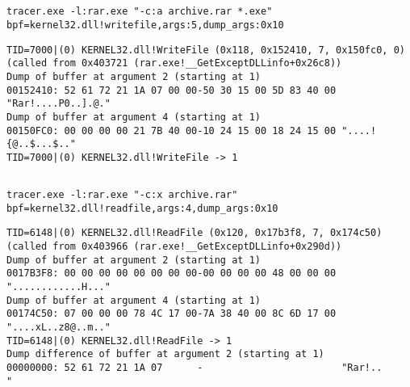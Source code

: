 \subsection{}

\begin{lstlisting}
tracer.exe -l:rar.exe "-c:a archive.rar *.exe" bpf=kernel32.dll!writefile,args:5,dump_args:0x10
\end{lstlisting}


\begin{lstlisting}
TID=7000|(0) KERNEL32.dll!WriteFile (0x118, 0x152410, 7, 0x150fc0, 0) (called from 0x403721 (rar.exe!__GetExceptDLLinfo+0x26c8))
Dump of buffer at argument 2 (starting at 1)
00152410: 52 61 72 21 1A 07 00 00-50 30 15 00 5D 83 40 00 "Rar!....P0..].@."
Dump of buffer at argument 4 (starting at 1)
00150FC0: 00 00 00 00 21 7B 40 00-10 24 15 00 18 24 15 00 "....!{@..$...$.."
TID=7000|(0) KERNEL32.dll!WriteFile -> 1
\end{lstlisting}

\subsection{}

\begin{lstlisting}
tracer.exe -l:rar.exe "-c:x archive.rar" bpf=kernel32.dll!readfile,args:4,dump_args:0x10
\end{lstlisting}


\begin{lstlisting}
TID=6148|(0) KERNEL32.dll!ReadFile (0x120, 0x17b3f8, 7, 0x174c50) (called from 0x403966 (rar.exe!__GetExceptDLLinfo+0x290d))
Dump of buffer at argument 2 (starting at 1)
0017B3F8: 00 00 00 00 00 00 00 00-00 00 00 00 48 00 00 00 "............H..."
Dump of buffer at argument 4 (starting at 1)
00174C50: 07 00 00 00 78 4C 17 00-7A 38 40 00 8C 6D 17 00 "....xL..z8@..m.."
TID=6148|(0) KERNEL32.dll!ReadFile -> 1
Dump difference of buffer at argument 2 (starting at 1)
00000000: 52 61 72 21 1A 07      -                        "Rar!..          "
\end{lstlisting}

